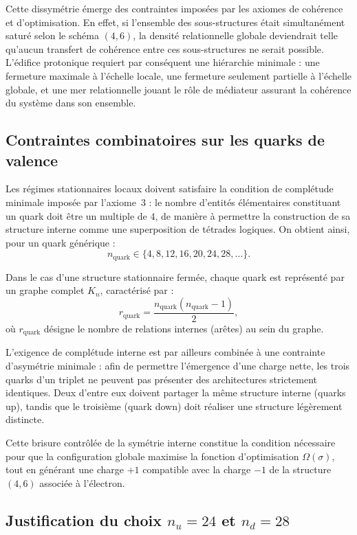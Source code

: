 \documentclass[11pt,a4paper]{article}
\begin{document}
Cette dissymétrie émerge des contraintes imposées par les axiomes de cohérence et d’optimisation. En effet, si l’ensemble des sous-structures était simultanément saturé selon le schéma \(\left(4,6\right)\), la densité relationnelle globale deviendrait telle qu’aucun transfert de cohérence entre ces sous-structures ne serait possible. L’édifice protonique requiert par conséquent une hiérarchie minimale : une fermeture maximale à l’échelle locale, une fermeture seulement partielle à l’échelle globale, et une mer relationnelle jouant le rôle de médiateur assurant la cohérence du système dans son ensemble.

\subsection{Contraintes combinatoires sur les quarks de valence}

Les régimes stationnaires locaux doivent satisfaire la condition de complétude minimale imposée par l’axiome~3 : le nombre d’entités élémentaires constituant un quark doit être un multiple de \(4\), de manière à permettre la construction de sa structure interne comme une superposition de tétrades logiques. On obtient ainsi, pour un quark générique :
\[
n_{\mathrm{quark}} \in \{4,8,12,16,20,24,28,\ldots\}.
\]

Dans le cas d’une structure stationnaire fermée, chaque quark est représenté par un graphe complet \(K_n\), caractérisé par :
\[
r_{\mathrm{quark}}
= \frac{n_{\mathrm{quark}}\left(n_{\mathrm{quark}}-1\right)}{2},
\]
où \(r_{\mathrm{quark}}\) désigne le nombre de relations internes (arêtes) au sein du graphe.

L’exigence de complétude interne est par ailleurs combinée à une contrainte d’asymétrie minimale : afin de permettre l’émergence d’une charge nette, les trois quarks d’un triplet ne peuvent pas présenter des architectures strictement identiques. Deux d’entre eux doivent partager la même structure interne (quarks up), tandis que le troisième (quark down) doit réaliser une structure légèrement distincte.

Cette brisure contrôlée de la symétrie interne constitue la condition nécessaire pour que la configuration globale maximise la fonction d’optimisation \(\Omega\left(\sigma\right)\), tout en générant une charge \(+1\) compatible avec la charge \(-1\) de la structure \(\left(4,6\right)\) associée à l’électron.

\subsection{Justification du choix \(n_u = 24\) et \(n_d = 28\)}
\end{document}
